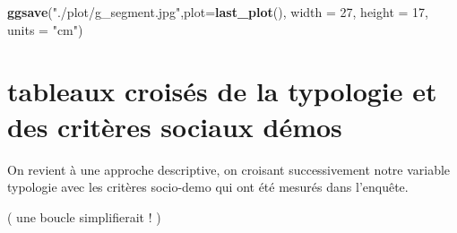 \documentclass[
]{book}
\newenvironment{Shaded}{\begin{snugshade}}{\end{snugshade}}
\newcommand{\DataTypeTok}[1]{\textcolor[rgb]{0.13,0.29,0.53}{#1}}
\newcommand{\DecValTok}[1]{\textcolor[rgb]{0.00,0.00,0.81}{#1}}
\newcommand{\KeywordTok}[1]{\textcolor[rgb]{0.13,0.29,0.53}{\textbf{#1}}}
\newcommand{\NormalTok}[1]{#1}
\newcommand{\StringTok}[1]{\textcolor[rgb]{0.31,0.60,0.02}{#1}}
\begin{document}
\begin{Shaded}
\begin{Highlighting}[]
\KeywordTok{ggsave}\NormalTok{(}\StringTok{"./plot/g_segment.jpg"}\NormalTok{,}\DataTypeTok{plot=}\KeywordTok{last_plot}\NormalTok{(), }\DataTypeTok{width =} \DecValTok{27}\NormalTok{, }\DataTypeTok{height =} \DecValTok{17}\NormalTok{, }\DataTypeTok{units =} \StringTok{"cm"}\NormalTok{)}
\end{Highlighting}
\end{Shaded}

\hypertarget{tableaux-croisuxe9s-de-la-typologie-et-des-crituxe8res-sociaux-duxe9mos}{%
\section{tableaux croisés de la typologie et des critères sociaux démos}\label{tableaux-croisuxe9s-de-la-typologie-et-des-crituxe8res-sociaux-duxe9mos}}

On revient à une approche descriptive, on croisant successivement notre variable typologie avec les critères socio-demo qui ont été mesurés dans l'enquête.

( une boucle simplifierait ! )
\end{document}
